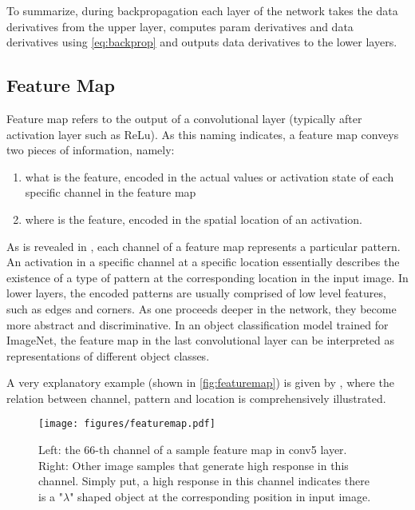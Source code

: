To summarize, during backpropagation each layer of the network takes the data derivatives from the upper layer, computes param derivatives and data derivatives using \autoref{eq:backprop} and outputs data derivatives to the lower layers. 
\subsection{Feature Map}\label{sec:featmap}
Feature map refers to the output of a convolutional layer (typically after activation layer such as ReLu).
As this naming indicates, a feature map conveys two pieces of information, namely:
\begin{enumerate}
\item what is the feature, encoded in the actual values or activation state of each specific channel in the feature map
\item where is the feature, encoded in the spatial location of an activation.
\end{enumerate}

As is revealed in \cite{zeiler2014visualizing}, each channel of a feature map represents a particular pattern. 
An activation in a specific channel at a specific location essentially describes the existence of a type of pattern at the corresponding location in the input image.
In lower layers, the encoded patterns are usually comprised of low level features, such as edges and corners. 
As one proceeds deeper in the network, they become more abstract and discriminative.
In an object classification model trained for ImageNet, the feature map in the last convolutional layer can be interpreted as representations of different object classes. 

A very explanatory example (shown in \autoref{fig:featuremap}) is given by \cite{kaiminghe}, where the relation between channel, pattern and location is comprehensively illustrated.

\begin{figure}[ht]
\centering
\texttt{[image: figures/featuremap.pdf]}
\caption[Feature map]{Left: the $ 66 $-th channel of a sample feature map in conv5 layer. Right: Other image samples that generate high response in this channel. Simply put, a high response in this channel indicates there is a "$ \lambda $" shaped object at the corresponding position in input image.}\label{fig:featuremap}
\end{figure}

